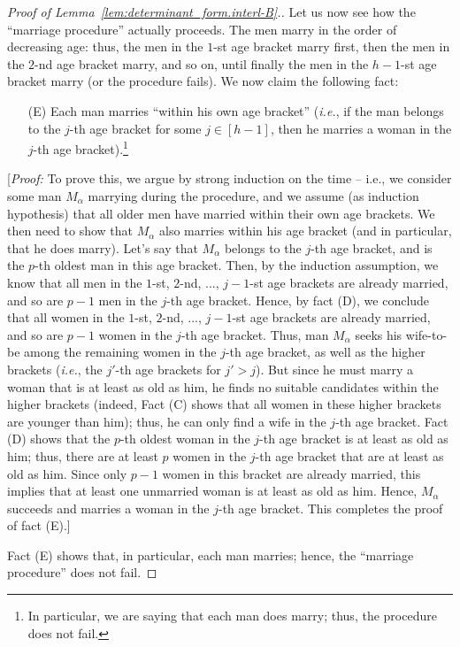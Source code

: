 \documentclass[reqno]{amsart}
\newcommand{\0}{\phantom{c}}
\newcommand{\ive}[1]{\left[ #1 \right]}
\theoremstyle{plain}
\theoremstyle{definition}
\numberwithin{equation}{section}
\begin{document}
\begin{proof}[Proof of Lemma~\ref{lem:determinant_form.interl-B}.]
Let us now see how the ``marriage procedure'' actually proceeds.
The men marry in the order of decreasing age: thus, the men in the $1$-st age bracket marry first, then the men in the $2$-nd age bracket marry, and so on, until finally the men in the $h-1$-st age bracket marry (or the procedure fails).
We now claim the following fact:
\begin{enumerate}
\item[(E)] Each man marries ``within his own age bracket'' (\textit{i.e.}, if the man belongs to the $j$-th age bracket for some $j \in \ive{h-1}$, then he marries a woman in the $j$-th age bracket).\footnote{In particular, we are saying that each man does marry; thus, the procedure does not fail.}
\end{enumerate}
[\textit{Proof:} To prove this, we argue by strong induction on the time -- i.e., we consider some man $M_\alpha$ marrying during the procedure, and we assume (as induction hypothesis) that all older men have married within their own age brackets. We then need to show that $M_\alpha$ also marries within his age bracket (and in particular, that he does marry).
Let's say that $M_\alpha$ belongs to the $j$-th age bracket, and is the $p$-th oldest man in this age bracket. Then, by the induction assumption, we know that all men in the $1$-st, $2$-nd, ..., $j-1$-st age brackets are already married, and so are $p-1$ men in the $j$-th age bracket. Hence, by fact (D), we conclude that all women in the $1$-st, $2$-nd, ..., $j-1$-st age brackets are already married, and so are $p-1$ women in the $j$-th age bracket. Thus, man $M_\alpha$ seeks his wife-to-be among the remaining women in the $j$-th age bracket, as well as the higher brackets (\textit{i.e.}, the $j'$-th age brackets for $j' > j$). But since he must marry a woman that is at least as old as him, he finds no suitable candidates within the higher brackets (indeed, Fact (C) shows that all women in these higher brackets are younger than him); thus, he can only find a wife in the $j$-th age bracket. Fact (D) shows that the $p$-th oldest woman in the $j$-th age bracket is at least as old as him; thus, there are at least $p$ women in the $j$-th age bracket that are at least as old as him. Since only $p-1$ women in this bracket are already married, this implies that at least one unmarried woman is at least as old as him. Hence, $M_\alpha$ succeeds and marries a woman in the $j$-th age bracket. This completes the proof of fact (E).]

Fact (E) shows that, in particular, each man marries; hence, the ``marriage procedure'' does not fail.


\end{proof}
\end{document}
